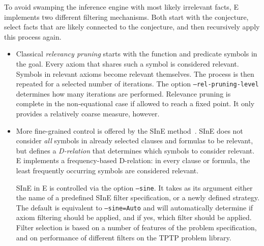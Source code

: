 \documentclass{report}
\begin{document}
To avoid swamping the inference engine with most likely irrelevant
facts, E implements two different filtering mechanisms. Both start
with the conjecture, select facts that are likely connected to the
conjecture, and then recursively apply this process again.

\begin{itemize}
\item Classical \emph{relevancy pruning}
  starts with the function and predicate symbols in the goal. Every
  axiom that shares such a symbol is considered relevant. Symbols in
  relevant axioms become relevant themselves. The process is then
  repeated for a selected number of iterations. The option
  \texttt{--rel-pruning-level} determines how many iterations are
  performed.  Relevance pruning is complete in the non-equational case
  if allowed to reach a fixed point. It only provides a relatively
  coarse measure, however.
\item More fine-grained control is offered by the SInE
  method~\cite{HV:CADE-2011}. SInE does not consider \emph{all}
  symbols in already selected clauses and formulas to be relevant, but
  defines a \emph{D-relation} that determines which symbols to
  consider relevant. E implements a frequency-based D-relation: in
  every clause or formula, the least frequently occurring symbols are
  considered relevant.

  SInE in E is controlled via the option \texttt{--sine}. It takes as
  its argument either the name of a predefined SInE filter
  specification, or a newly defined strategy. The default is
  equivalent to \texttt{--sine=Auto} and will automatically determine
  if axiom filtering should be applied, and if yes, which filter
  should be applied. Filter selection is based on a number of features
  of the problem specification, and on performance of different
  filters on the TPTP problem library.


\end{itemize}
\end{document}
